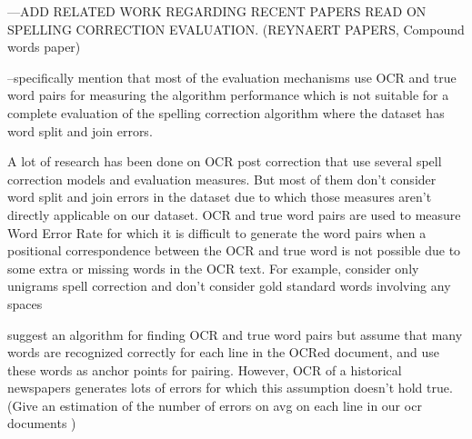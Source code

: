 ---ADD RELATED WORK REGARDING RECENT PAPERS READ ON SPELLING CORRECTION EVALUATION. (REYNAERT PAPERS, Compound words paper)

--specifically mention that most of the evaluation mechanisms use OCR and true word pairs for measuring the algorithm performance which is not suitable for a complete evaluation of the spelling correction algorithm where the dataset has word split and join errors.

A lot of research has been done on OCR post correction that use several spell correction models and evaluation measures. But most of them don't consider word split and join errors in the dataset due to which those measures aren't directly applicable on our dataset. 
OCR and true word pairs are used to measure Word Error Rate for which it is difficult to generate the word pairs when a positional correspondence between the OCR and true word is not possible due to some extra or missing words in the OCR text.
For example, \cite{reynaert2011character} consider only unigrams spell correction and don't consider gold standard words involving any spaces 

\cite{kolak2002ocr} suggest an algorithm for finding OCR and true word pairs but assume that many words are recognized correctly for each line in the OCRed document, and use these words as anchor points for pairing. However, OCR of a historical newspapers generates lots of errors for which this assumption doesn't hold true. (Give an estimation of the number of errors on avg on each line in our ocr documents )




